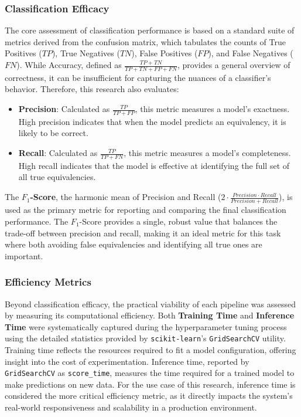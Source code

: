 \subsubsection{Classification Efficacy}\label{ch:3.4.2.1}
The core assessment of classification performance is based on a standard suite of metrics derived from the confusion matrix, which tabulates the counts of True Positives (\(TP\)), True Negatives (\(TN\)), False Positives (\(FP\)), and False Negatives (\(FN\)). While Accuracy, defined as \(\frac{TP + TN}{TP + TN + FP + FN}\), provides a general overview of correctness, it can be insufficient for capturing the nuances of a classifier's behavior. Therefore, this research also evaluates:
\begin{itemize}
    \item \textbf{Precision}: Calculated as \(\frac{TP}{TP + FP}\), this metric measures a model's exactness. High precision indicates that when the model predicts an equivalency, it is likely to be correct.
    \item \textbf{Recall}: Calculated as \(\frac{TP}{TP + FN}\), this metric measures a model's completeness. High recall indicates that the model is effective at identifying the full set of all true equivalencies.
\end{itemize}
The \textbf{\(F_1\)-Score}, the harmonic mean of Precision and Recall (\(2\cdot\frac{Precision\cdot Recall}{Precision + Recall}\)), is used as the primary metric for reporting and comparing the final classification performance. The \(F_1\)-Score provides a single, robust value that balances the trade-off between precision and recall, making it an ideal metric for this task where both avoiding false equivalencies and identifying all true ones are important.

\subsubsection{Efficiency Metrics}\label{ch:3.4.2.2}
Beyond classification efficacy, the practical viability of each pipeline was assessed by measuring its computational efficiency. Both \textbf{Training Time} and \textbf{Inference Time} were systematically captured during the hyperparameter tuning process using the detailed statistics provided by \verb|scikit-learn|'s \verb|GridSearchCV| utility. Training time reflects the resources required to fit a model configuration, offering insight into the cost of experimentation. Inference time, reported by \verb|GridSearchCV| as \verb|score_time|, measures the time required for a trained model to make predictions on new data. For the use case of this research, inference time is considered the more critical efficiency metric, as it directly impacts the system's real-world responsiveness and scalability in a production environment.

